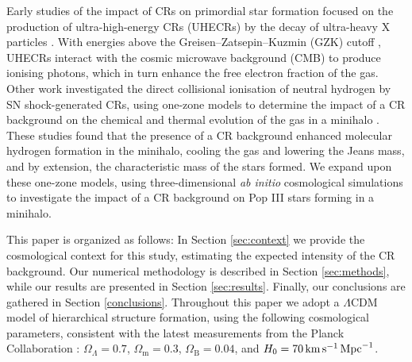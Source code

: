 \documentclass[../thesis.tex]{subfiles}
\begin{document}
Early studies of the impact of CRs on primordial star formation focused on the production of ultra-high-energy CRs (UHECRs) by the decay of ultra-heavy X particles \citep{ShchekinovVasiliev2004,VasilievShchekinov2006,RipamontiMapelliFerrara2007}.  
With energies above the Greisen--Zatsepin--Kuzmin (GZK) cutoff \citep{Greisen1966,ZatsepinKuzmin1966}, UHECRs interact with the cosmic microwave background (CMB) to produce ionising photons, which in turn enhance the free electron fraction of the gas.  
Other work investigated the direct collisional ionisation of neutral hydrogen by SN shock-generated CRs, using one-zone models to determine the impact of a CR background on the chemical and thermal evolution of the gas in a minihalo \citep{StacyBromm2007,JascheCiardiEnsslin2007}.  
These studies found that the presence of a CR background enhanced molecular hydrogen formation in the minihalo, cooling the gas and lowering the Jeans mass, and by extension, the characteristic mass of the stars formed. 
We expand upon these one-zone models, using three-dimensional \textit{ab initio} cosmological simulations to investigate the impact of a CR background on Pop III stars forming in a minihalo.

This paper is organized as follows: In Section \ref{sec:context} we provide the cosmological context for this study, estimating the expected intensity of the CR background. Our numerical methodology is described in Section \ref{sec:methods}, while our results are presented in Section \ref{sec:results}.  
Finally, our conclusions are gathered in Section \ref{conclusions}. Throughout this paper we adopt a $\Lambda$CDM model of hierarchical structure formation, using the following cosmological parameters, consistent with the latest measurements from the Planck Collaboration \citep{PlanckParams2015}: $\Omega_{\Lambda} = 0.7$, $\Omega_{\mathrm m} = 0.3$, $\Omega_{\mathrm B} = 0.04$, and $H_0 = 70 \,\mathrm{km}\,\mathrm{s}^{-1} \,\mathrm{Mpc}^{-1}$.
\end{document}
